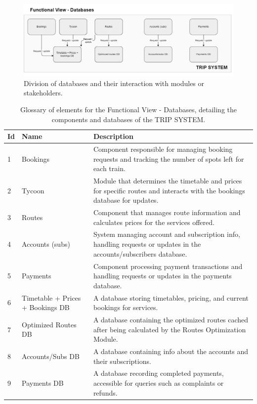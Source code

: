 \begin{figure}[H]
    \centering
    \includegraphics[width=\textwidth]{drawings/views_draft2/functional_view databases.png}
    \caption{Division of databases and their interaction with modules or stakeholders.}
    \label{fig:databases_view}
\end{figure}
\begin{table}[ht]
\centering
\begin{tabular}{@{}llp{10cm}@{}}
\toprule
\textbf{Id} & \textbf{Name} & \textbf{Description} \\
\midrule
1 & Bookings & Component responsible for managing booking requests and tracking the number of spots left for each train. \\
2 & Tycoon & Module that determines the timetable and prices for specific routes and interacts with the bookings database for updates. \\
3 & Routes & Component that manages route information and calculates prices for the services offered. \\
4 & Accounts (subs) & System managing account and subscription info, handling requests or updates in the accounts/subscribers database. \\
5 & Payments & Component processing payment transactions and handling requests or updates in the payments database. \\
6 & Timetable + Prices + Bookings DB & A database storing timetables, pricing, and current bookings for services. \\
7 & Optimized Routes DB & A database containing the optimized routes cached after being calculated by the Routes Optimization Module. \\
8 & Accounts/Subs DB & A database containing info about the accounts and their subscriptions. \\
9 & Payments DB & A database recording completed payments, accessible for queries such as complaints or refunds. \\
\bottomrule
\end{tabular}
\caption{Glossary of elements for the Functional View - Databases, detailing the components and databases of the TRIP SYSTEM.}
\label{tab:glossary_elements}
\end{table}

